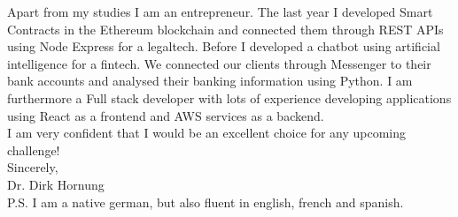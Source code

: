 \documentclass[11pt]{article}
\begin{document}
\noindent Apart from my studies I am an entrepreneur. The last year I developed
Smart Contracts in the Ethereum blockchain and connected them through REST APIs
using Node Express for a legaltech. Before I developed a chatbot using
artificial intelligence for a fintech. We connected our clients through
Messenger to their bank accounts and analysed their banking information using
Python. I am furthermore a Full stack developer with lots of experience developing
applications using React as a frontend and AWS services as a backend.  \\

\noindent I am very confident that I would be an excellent choice for any
upcoming challenge! \\

\noindent Sincerely, \\
Dr. Dirk Hornung \\

\noindent P.S. I am a native german, but also fluent in english, french and spanish.
\newpage

	
\end{document}
